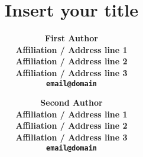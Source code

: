 \title{Insert your title}

\author{\bf First Author \\
  Affiliation / Address line 1 \\
  Affiliation / Address line 2 \\
  Affiliation / Address line 3 \\
  \texttt{email@domain} \\
  \and \bf Second Author \\
  Affiliation / Address line 1 \\
  Affiliation / Address line 2 \\
  Affiliation / Address line 3 \\
  \texttt{email@domain} \\}

